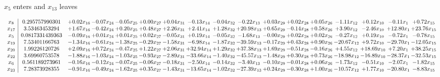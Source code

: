 \documentclass[9pt]{article}
\begin{document}
 $ x_{5} $ enters and $ x_{13} $ leaves 

 \[\begin{array}{c| c c@{\hskip 2pt} c@{\hskip 2pt} c@{\hskip 2pt} c@{\hskip 2pt} c@{\hskip 2pt} c@{\hskip 2pt} c@{\hskip 2pt} c@{\hskip 2pt} c@{\hskip 2pt} c@{\hskip 2pt} c@{\hskip 2pt} c@{\hskip 2pt} c@{\hskip 2pt} c@{\hskip 2pt} c@{\hskip 2pt} }
 x_{8}   &  0.295757990301 & +  0.02 x_{16} & -0.07 x_{24} & -0.05 x_{25} & +  0.00 x_{27} & +  0.04 x_{31} & -0.13 x_{14} & -0.04 x_{32} & -0.22 x_{13} & +  0.03 x_{29} & +  0.02 x_{28} & +  0.05 x_{26} & -1.11 x_{12} & +  0.12 x_{10} & -0.11 x_{1} & +  0.72 x_{15}\\
 x_{17}   &  3.53463453294 & +  1.67 x_{16} & -0.42 x_{24} & +  0.20 x_{25} & +  0.48 x_{27} & +  2.26 x_{31} & +  2.41 x_{14} & +  1.28 x_{32} & + 20.98 x_{13} & +  0.65 x_{29} & -0.14 x_{28} & +  0.58 x_{26} & +  3.90 x_{12} & -2.46 x_{10} & + 12.80 x_{1} & + 23.76 x_{15}\\
 x_{5}   &  0.0817331439363 & -0.09 x_{16} & +  0.01 x_{24} & +  0.01 x_{25} & +  0.02 x_{27} & -0.05 x_{31} & +  0.19 x_{14} & -0.05 x_{32} & -1.68 x_{13} & -0.00 x_{29} & +  0.02 x_{28} & +  0.02 x_{26} & -0.27 x_{12} & +  0.19 x_{10} & -0.72 x_{1} & -0.78 x_{15}\\
 x_{19}   &  7.53401166763 & -1.34 x_{16} & -0.61 x_{24} & -1.38 x_{25} & -0.29 x_{27} & -1.58 x_{31} & -6.98 x_{14} & -1.87 x_{32} & -39.59 x_{13} & -0.17 x_{29} & +  0.43 x_{28} & +  0.90 x_{26} & -20.67 x_{12} & +  9.72 x_{10} & -29.70 x_{1} & -12.05 x_{15}\\
 x_{20}   &  1.99226120726 & +  2.09 x_{16} & +  0.72 x_{24} & -0.47 x_{25} & +  1.22 x_{27} & +  2.06 x_{31} & + 32.94 x_{14} & +  1.29 x_{32} & + 37.38 x_{13} & +  1.69 x_{29} & -0.51 x_{28} & -0.16 x_{26} & +  4.55 x_{12} & + 18.69 x_{10} & +  7.20 x_{1} & + 38.25 x_{15}\\
 x_{22}   &  3.69960753578 & -1.88 x_{16} & -1.03 x_{24} & -1.03 x_{25} & -0.93 x_{27} & -2.89 x_{31} & -33.66 x_{14} & -1.40 x_{32} & -45.57 x_{13} & -1.48 x_{29} & +  0.30 x_{28} & +  0.73 x_{26} & -18.98 x_{12} & -16.89 x_{10} & -28.37 x_{1} & -32.53 x_{15}\\
 x_{6}   &  0.561189273961 & -0.16 x_{16} & -0.12 x_{24} & -0.07 x_{25} & -0.06 x_{27} & -0.18 x_{31} & -2.50 x_{14} & -0.14 x_{32} & -3.40 x_{13} & -0.10 x_{29} & -0.01 x_{28} & +  0.06 x_{26} & -1.73 x_{12} & -0.51 x_{10} & -2.07 x_{1} & -1.82 x_{15}\\
 x_{23}   &  7.28373928355 & -0.91 x_{16} & -0.49 x_{24} & -1.62 x_{25} & +  0.35 x_{27} & -1.43 x_{31} & -13.65 x_{14} & -1.02 x_{32} & -27.39 x_{13} & +  0.24 x_{29} & -0.30 x_{28} & +  1.00 x_{26} & -10.57 x_{12} & +  1.77 x_{10} & -20.80 x_{1} & -8.83 x_{15}\\

\end{array}\]
\end{document}
